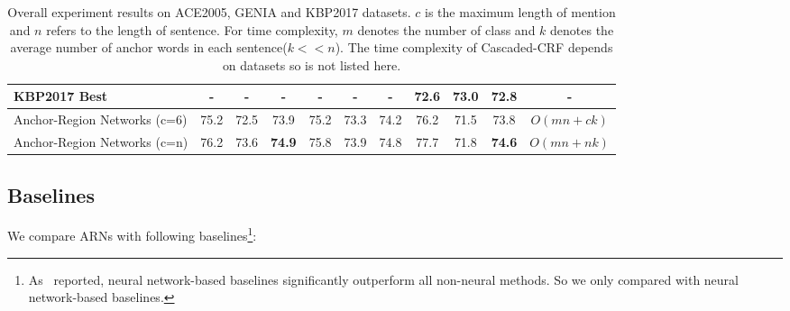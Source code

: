 \documentclass[11pt,a4paper]{article}
\begin{document}
\begin{table*}[!ht]
\begin{center}
{\begin{tabular}{l||c|c|c||c|c|c||c|c|c||c}
  KBP2017 Best~\cite{ji2017overview}      & -             & -         & -     & -            & -         & -     & 72.6           & 73.0       & 72.8   & -  \\  \hline\hline

  Anchor-Region Networks (c=6)            & 75.2          & 72.5      & 73.9  & 75.2         & 73.3      & 74.2  & 76.2           & 71.5       & 73.8   & $O(mn+ck)$   \\
  Anchor-Region Networks (c=n)            & 76.2          & 73.6      & \textbf{74.9}  & 75.8         & 73.9      & 74.8  & 77.7           & 71.8       & \textbf{74.6} & $O(mn+nk)$   \\ \hline
\end{tabular}
}
\end{center}
\caption{Overall experiment results on ACE2005, GENIA and KBP2017 datasets. $c$ is the maximum length of mention and $n$ refers to the length of sentence. For time complexity, $m$ denotes the number of class and $k$ denotes the average number of anchor words in each sentence($k<<n$). The time complexity of Cascaded-CRF depends on datasets so is not listed here.}
\label{tab:overall_rst}
\end{table*}


\subsection{Baselines}
We compare ARNs with following baselines\footnote{As~\citet{D18-1019} reported, neural network-based baselines significantly outperform all non-neural methods. So we only compared with neural network-based baselines.}:
\end{document}
